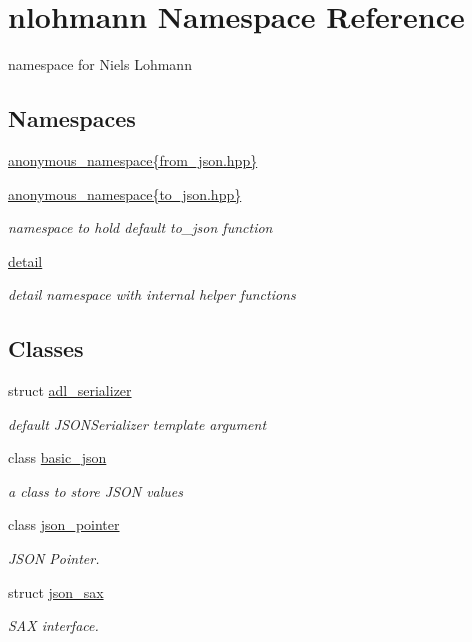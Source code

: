 \hypertarget{namespacenlohmann}{}\section{nlohmann Namespace Reference}
\label{namespacenlohmann}


namespace for Niels Lohmann  


\subsection*{Namespaces}
\begin{DoxyCompactItemize}
\item 
 \hyperlink{namespacenlohmann_1_1anonymous__namespace_02from__json_8hpp_03}{anonymous\+\_\+namespace\{from\+\_\+json.\+hpp\}}
\item 
 \hyperlink{namespacenlohmann_1_1anonymous__namespace_02to__json_8hpp_03}{anonymous\+\_\+namespace\{to\+\_\+json.\+hpp\}}
\begin{DoxyCompactList}\small\item\em namespace to hold default {\ttfamily to\+\_\+json} function \end{DoxyCompactList}\item 
 \hyperlink{namespacenlohmann_1_1detail}{detail}
\begin{DoxyCompactList}\small\item\em detail namespace with internal helper functions \end{DoxyCompactList}\end{DoxyCompactItemize}
\subsection*{Classes}
\begin{DoxyCompactItemize}
\item 
struct \hyperlink{structnlohmann_1_1adl__serializer}{adl\+\_\+serializer}
\begin{DoxyCompactList}\small\item\em default J\+S\+O\+N\+Serializer template argument \end{DoxyCompactList}\item 
class \hyperlink{classnlohmann_1_1basic__json}{basic\+\_\+json}
\begin{DoxyCompactList}\small\item\em a class to store J\+S\+ON values \end{DoxyCompactList}\item 
class \hyperlink{classnlohmann_1_1json__pointer}{json\+\_\+pointer}
\begin{DoxyCompactList}\small\item\em J\+S\+ON Pointer. \end{DoxyCompactList}\item 
struct \hyperlink{structnlohmann_1_1json__sax}{json\+\_\+sax}
\begin{DoxyCompactList}\small\item\em S\+AX interface. \end{DoxyCompactList}\end{DoxyCompactItemize}
